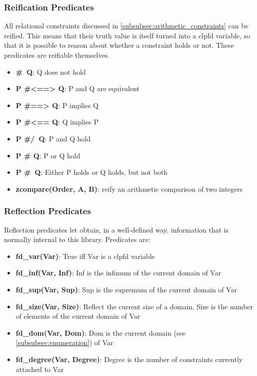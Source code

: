 \subsubsection{Reification Predicates}\label{subsubsec:reification}
All relational constraints discussed in \ref{subsubsec:arithmetic_constraints} can be reified.
This means that their truth value is itself turned into a clpfd variable, so that it is possible to reason about whether a constraint holds or not. These predicates are reifiable themselves.
\begin{itemize}
    \item \textbf{\#\ Q}: Q does not hold
    \item \textbf{P \#<==> Q}: P and Q are equivalent
    \item \textbf{P \#==> Q}: P implies Q
    \item \textbf{P \#<== Q}: Q implies P
    \item \textbf{P \#/\ Q}: P and Q hold
    \item \textbf{P \#\/ Q}: P or Q hold
    \item \textbf{P \#\ Q}: Either P holds or Q holds, but not both
    \item \textbf{zcompare(Order, A, B)}: reify an arithmetic comparison of two integers
\end{itemize}

\subsubsection{Reflection Predicates}\label{subsubsec:reflection}
Reflection predicates let obtain, in a well-defined way, information that is normally internal to this library. Predicates are:
\begin{itemize}
    \item \textbf{fd\_var(Var)}: True iff Var is a clpfd variable
    \item \textbf{fd\_inf(Var, Inf)}: Inf is the infimum of the current domain of Var
    \item \textbf{fd\_sup(Var, Sup)}: Sup is the supremum of the current domain of Var
    \item \textbf{fd\_size(Var, Size)}: Reflect the current size of a domain. Size is the number of elements of the current domain of Var
    \item \textbf{fd\_dom(Var, Dom)}: Dom is the current domain (see \ref{subsubsec:enumeration}) of Var
    \item \textbf{fd\_degree(Var, Degree)}: Degree is the number of constraints currently attached to Var
\end{itemize}

